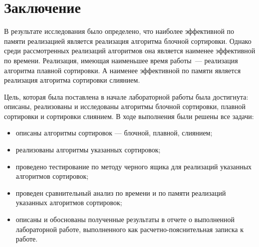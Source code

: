 \chapter*{Заключение}

В результате исследования было определено, что наиболее эффективной по памяти реализацией является реализация алгоритма блочной сортировки. Однако среди рассмотренных реализаций алгоритмов она является наименее эффективной по времени. Реализация, имеющая наименьшее время работы~--- реализация алгоритма плавной сортировки. А наименее эффективной по памяти является реализация алгоритма сортировки слиянием. 

Цель, которая была поставлена в начале лабораторной работы была достигнута: описаны, реализованы и исследованы алгоритмы блочной сортировки, плавной сортировки и сортировки слиянием. В ходе выполнения были решены все задачи:

\begin{itemize}[label=---]
	\item описаны алгоритмы сортировок --- блочной, плавной, слиянием;
	
	\item реализованы алгоритмы указанных сортировок;
	
	\item проведено тестирование по методу черного ящика для реализаций указанных алгоритмов сортировок;
	
	\item проведен сравнительный анализ по времени и по памяти реализаций указанных алгоритмов сортировок;
	
	\item описаны и обоснованы полученные результаты в отчете о выполненной лабораторной работе, выполненного как расчетно-пояснительная записка к работе.
\end{itemize}